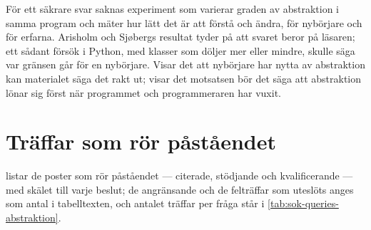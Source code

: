 För ett säkrare svar saknas experiment som varierar graden av
abstraktion i samma program och mäter hur lätt det är att förstå och
ändra, för nybörjare och för erfarna.  Arisholm och Sjøbergs resultat
tyder på att svaret beror på läsaren; ett sådant försök i Python, med
klasser som döljer mer eller mindre, skulle säga var gränsen går för en
nybörjare.  Visar det att nybörjare har nytta av abstraktion kan
materialet säga det rakt ut; visar det motsatsen bör det säga att
abstraktion lönar sig först när programmet och programmeraren har vuxit.

\section{Träffar som rör påståendet}
\label{sec:abs-traffar}

 listar de poster som rör påståendet ---
citerade, stödjande och kvalificerande --- med skälet till varje beslut;
de angränsande och de felträffar som uteslöts anges som antal i
tabelltexten, och antalet träffar per fråga står i
\cref{tab:sok-queries-abstraktion}.
